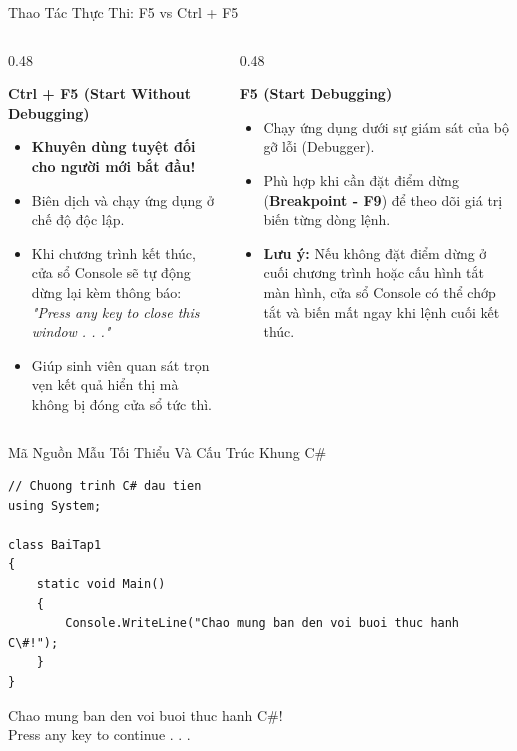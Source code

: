 \documentclass[aspectratio=169, 10pt]{beamer}
\begin{document}
\begin{frame}{Thao Tác Thực Thi: F5 vs Ctrl + F5}
  \begin{columns}[T]
    \begin{column}{0.48\textwidth}
      \begin{block}{\textbf{Ctrl + F5 (Start Without Debugging)}}
        \begin{itemize}
          \item \textbf{Khuyên dùng tuyệt đối cho người mới bắt đầu!}
          \item Biên dịch và chạy ứng dụng ở chế độ độc lập.
          \item Khi chương trình kết thúc, cửa sổ Console sẽ tự động dừng lại kèm thông báo: \textit{"Press any key to close this window . . ."}
          \item Giúp sinh viên quan sát trọn vẹn kết quả hiển thị mà không bị đóng cửa sổ tức thì.
        \end{itemize}
      \end{block}
    \end{column}
    \begin{column}{0.48\textwidth}
      \begin{alertblock}{\textbf{F5 (Start Debugging)}}
        \begin{itemize}
          \item Chạy ứng dụng dưới sự giám sát của bộ gỡ lỗi (Debugger).
          \item Phù hợp khi cần đặt điểm dừng (\textbf{Breakpoint - F9}) để theo dõi giá trị biến từng dòng lệnh.
          \item \textbf{Lưu ý:} Nếu không đặt điểm dừng ở cuối chương trình hoặc cấu hình tắt màn hình, cửa sổ Console có thể chớp tắt và biến mất ngay khi lệnh cuối kết thúc.
        \end{itemize}
      \end{alertblock}
    \end{column}
  \end{columns}
\end{frame}

\begin{frame}[fragile]{Mã Nguồn Mẫu Tối Thiểu Và Cấu Trúc Khung C\#}
\begin{lstlisting}
// Chuong trinh C# dau tien
using System;

class BaiTap1
{
    static void Main()
    {
        Console.WriteLine("Chao mung ban den voi buoi thuc hanh C\#!");
    }
}
\end{lstlisting}
\begin{tcolorbox}[colback=UniDark,colframe=UniNavy,title=\textbf{Kết quả thực thi trên cửa sổ Console}]
\color{white}\ttfamily Chao mung ban den voi buoi thuc hanh C\#!\\
Press any key to continue . . .
\end{tcolorbox}
\end{frame}
\end{document}
